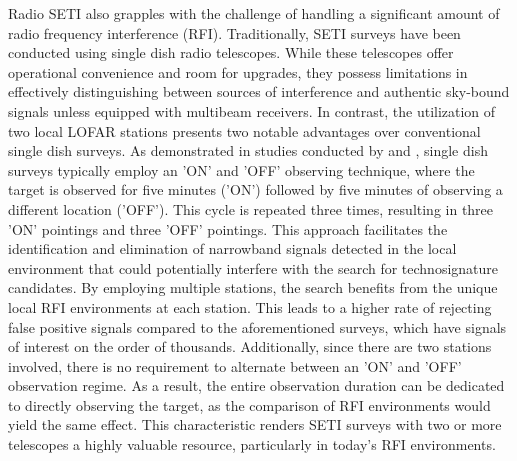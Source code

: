 Radio SETI also grapples with the challenge of handling a significant amount of radio frequency interference (RFI). Traditionally, SETI surveys have been conducted using single dish radio telescopes. While these telescopes offer operational convenience and room for upgrades, they possess limitations in effectively distinguishing between sources of interference and authentic sky-bound signals unless equipped with multibeam receivers. In contrast, the utilization of two local LOFAR stations presents two notable advantages over conventional single dish surveys. As demonstrated in studies conducted by \cite{Enriquez:2017} and \cite{danny-parkes}, single dish surveys typically employ an 'ON' and 'OFF' observing technique, where the target is observed for five minutes ('ON') followed by five minutes of observing a different location ('OFF'). This cycle is repeated three times, resulting in three 'ON' pointings and three 'OFF' pointings. This approach facilitates the identification and elimination of narrowband signals detected in the local environment that could potentially interfere with the search for technosignature candidates. By employing multiple stations, the search benefits from the unique local RFI environments at each station. This leads to a higher rate of rejecting false positive signals compared to the aforementioned surveys, which have signals of interest on the order of thousands. Additionally, since there are two stations involved, there is no requirement to alternate between an 'ON' and 'OFF' observation regime. As a result, the entire observation duration can be dedicated to directly observing the target, as the comparison of RFI environments would yield the same effect. This characteristic renders SETI surveys with two or more telescopes a highly valuable resource, particularly in today's RFI environments.

